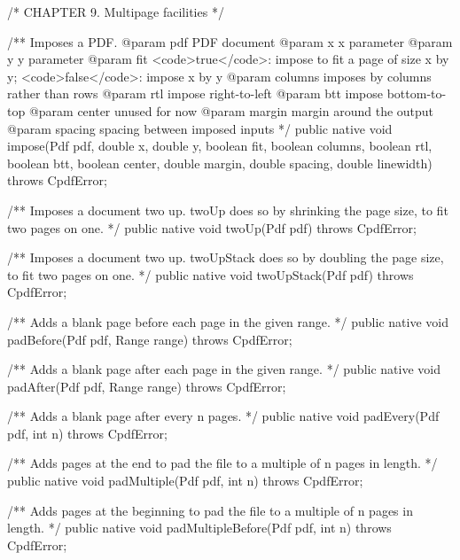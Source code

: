 /* CHAPTER 9. Multipage facilities */

/** Imposes a PDF.
@param pdf PDF document
@param x x parameter
@param y y parameter
@param fit <code>true</code>: impose to fit a page of size x by y;
<code>false</code>: impose x by y 
@param columns imposes by columns rather than rows
@param rtl impose right-to-left
@param btt impose bottom-to-top
@param center unused for now
@param margin margin around the output
@param spacing spacing between imposed inputs */
public native void impose(Pdf pdf, double x, double y, boolean fit,
                          boolean columns, boolean rtl, boolean btt,
                          boolean center, double margin, double spacing,
                          double linewidth)
    throws CpdfError;

/** Imposes a document two up. twoUp does so by shrinking the page size, to
fit two pages on one. */
public native void twoUp(Pdf pdf) throws CpdfError;

/** Imposes a document two up. twoUpStack does so by doubling the page
size, to fit two pages on one. */
public native void twoUpStack(Pdf pdf) throws CpdfError;

/** Adds a blank page before each page in the given range. */
public native void padBefore(Pdf pdf, Range range) throws CpdfError;

/** Adds a blank page after each page in the given range. */
public native void padAfter(Pdf pdf, Range range) throws CpdfError;

/** Adds a blank page after every n pages. */
public native void padEvery(Pdf pdf, int n) throws CpdfError;

/** Adds pages at the end to pad the file to a multiple of n pages in
length. */
public native void padMultiple(Pdf pdf, int n) throws CpdfError;

/** Adds pages at the beginning to pad the file to a multiple of n pages in
length. */
public native void padMultipleBefore(Pdf pdf, int n) throws CpdfError;
